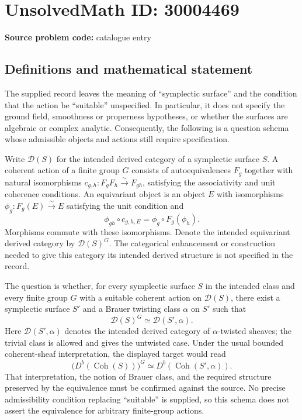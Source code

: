 \documentclass[11pt]{article}
\begin{document}
\section*{UnsolvedMath ID: 30004469}
\textbf{Source problem code:} catalogue entry
\subsection{Definitions and mathematical statement}
The supplied record leaves the meaning of ``symplectic surface'' and the condition that the action be ``suitable'' unspecified. In particular, it does not specify the ground field, smoothness or properness hypotheses, or whether the surfaces are algebraic or complex analytic. Consequently, the following is a question schema whose admissible objects and actions still require specification.

Write \(\mathcal D(S)\) for the intended derived category of a symplectic surface \(S\). A coherent action of a finite group \(G\) consists of autoequivalences \(F_g\) together with natural isomorphisms \(c_{g,h}\colon F_gF_h\xrightarrow{\sim}F_{gh}\), satisfying the associativity and unit coherence conditions. An equivariant object is an object \(E\) with isomorphisms \(\phi_g\colon F_g(E)\xrightarrow{\sim}E\) satisfying the unit condition and
\[
\phi_{gh}\circ c_{g,h,E}=\phi_g\circ F_g(\phi_h).
\]
Morphisms commute with these isomorphisms. Denote the intended equivariant derived category by \(\mathcal D(S)^G\). The categorical enhancement or construction needed to give this category its intended derived structure is not specified in the record.

The question is whether, for every symplectic surface \(S\) in the intended class and every finite group \(G\) with a suitable coherent action on \(\mathcal D(S)\), there exist a symplectic surface \(S'\) and a Brauer twisting class \(\alpha\) on \(S'\) such that
\[
\mathcal D(S)^G\simeq\mathcal D(S',\alpha).
\]
Here \(\mathcal D(S',\alpha)\) denotes the intended derived category of \(\alpha\)-twisted sheaves; the trivial class is allowed and gives the untwisted case. Under the usual bounded coherent-sheaf interpretation, the displayed target would read
\[
\bigl(D^b(\operatorname{Coh}(S))\bigr)^G
\simeq D^b(\operatorname{Coh}(S',\alpha)).
\]
That interpretation, the notion of Brauer class, and the required structure preserved by the equivalence must be confirmed against the source. No precise admissibility condition replacing ``suitable'' is supplied, so this schema does not assert the equivalence for arbitrary finite-group actions.
\end{document}
